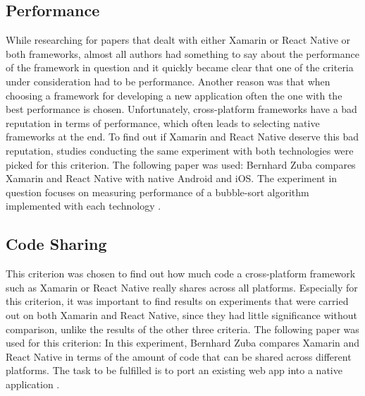 \documentclass[Bachelor,BIF,english]{twbook}
\begin{document}
\subsection{Performance}
While researching for papers that dealt with either Xamarin or React Native or both frameworks, almost all authors had something to say about the performance of the framework in question and it quickly became clear that one of the criteria under consideration had to be performance. Another reason was that when choosing a framework for developing a new application often the one with the best performance is chosen. Unfortunately, cross-platform frameworks have a bad reputation in terms of performance, which often leads to selecting native frameworks at the end. To find out if Xamarin and React Native deserve this bad reputation, studies conducting the same experiment with both technologies were picked for this criterion. The following paper was used: Bernhard Zuba compares Xamarin and React Native with native Android and iOS. The experiment in question focuses on measuring performance of a bubble-sort algorithm implemented with each technology \cite[p.~30-32]{ZubaBernhard2017EdPb}.

\subsection{Code Sharing}
This criterion was chosen to find out how much code a cross-platform framework such as Xamarin or React Native really shares across all platforms. Especially for this criterion, it was important to find results on experiments that were carried out on both Xamarin and React Native, since they had little significance without comparison, unlike the results of the other three criteria. The following paper was used for this criterion: In this experiment, Bernhard Zuba compares Xamarin and React Native in terms of the amount of code that can be shared across different platforms. The task to be fulfilled is to port an existing web app into a native application \cite[p.~71-73]{ZubaBernhard2017EdPb}.
\end{document}
